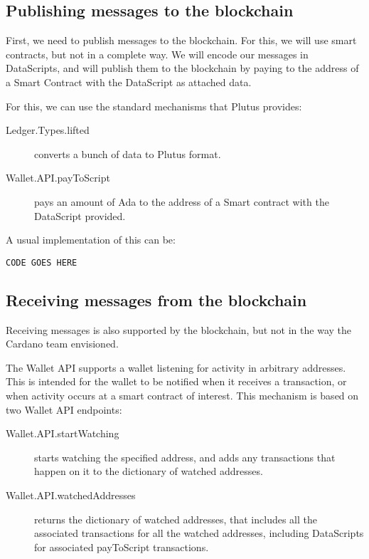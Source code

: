 \documentclass{article}
\begin{document}
\subsection{Publishing messages to the blockchain}
First, we need to publish messages to the blockchain. For this, we will use smart contracts, but not in a complete way. We will encode our messages in DataScripts, and will publish them to the blockchain by paying to the address of a Smart Contract with the DataScript as attached data.

For this, we can use the standard mechanisms that Plutus provides:

\begin{description}
\item [Ledger.Types.lifted] converts a bunch of data to Plutus format.
\item [Wallet.API.payToScript] pays an amount of Ada to the address of a Smart contract with the DataScript provided.
\end{description}

A usual implementation of this can be:

\begin{verbatim}
CODE GOES HERE
\end{verbatim}

\subsection{Receiving messages from the blockchain}
Receiving messages is also supported by the blockchain, but not in the way the Cardano team envisioned.

The Wallet API supports a wallet listening for activity in arbitrary addresses. This is intended for the wallet to be notified when it receives a transaction, or when activity occurs at a smart contract of interest. This mechanism is based on two Wallet API endpoints:

\begin{description}
\item [Wallet.API.startWatching] starts watching the specified address, and adds any transactions that happen on it to the dictionary of watched addresses.
\item [Wallet.API.watchedAddresses] returns the dictionary of watched addresses, that includes all the associated transactions for all the watched addresses, including DataScripts for associated payToScript transactions.
\end{description}
\end{document}

